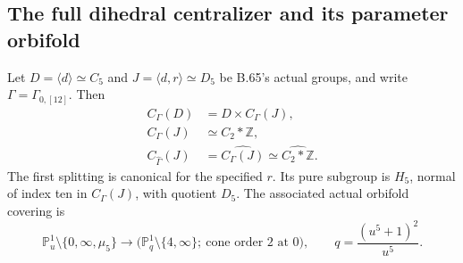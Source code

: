 \subsection*{The full dihedral centralizer and its parameter orbifold}

Let \(D=\langle d\rangle\simeq C_5\) and
\(J=\langle d,r\rangle\simeq D_5\) be B.65's actual groups,
and write \(\Gamma=\Gamma_{0,[12]}\).
Then
\[
 \begin{split}
 C_\Gamma(D)&=D\times C_\Gamma(J),\\
 C_\Gamma(J)&\simeq C_2*\mathbb Z,\\
 C_{\widehat\Gamma}(J)
       &=\widehat{C_\Gamma(J)}
          \simeq\widehat{C_2*\mathbb Z}.                         
 \end{split}                                                    \tag{B.74.1}
\]
The first splitting is canonical for the specified \(r\).
Its pure subgroup is \(H_5\), normal of index ten in
\(C_\Gamma(J)\), with quotient \(D_5\).
The associated actual orbifold covering is
\[
 \mathbb P^1_u\setminus\{0,\infty,\mu_5\}
       \longrightarrow
 \bigl(\mathbb P^1_q\setminus\{4,\infty\};\
                     \text{cone order }2\text{ at }0\bigr),
 \qquad q=\frac{(u^5+1)^2}{u^5}.                               \tag{B.74.2}
\]

